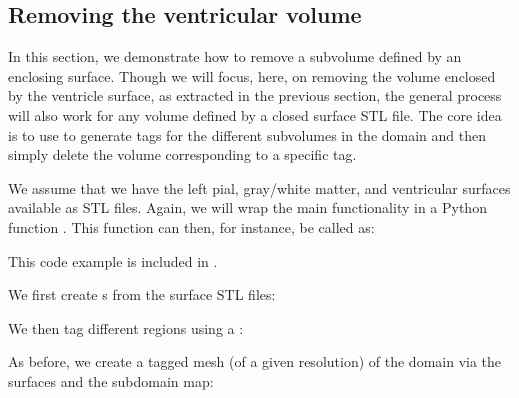 \subsection{Removing the ventricular volume}
\label{sec:chp4:tools:remove-vent:removal}  

In this section, we demonstrate how to remove a subvolume defined by
an enclosing surface. Though we will focus, here, on removing the
volume enclosed by the ventricle surface, as extracted in the previous
section, the general process will also work for any volume defined by
a closed surface STL file. The core idea is to use \svmtk{} to
generate tags for the different subvolumes in the domain and then
simply delete the volume corresponding to a specific tag.  

We assume that we have the left pial, gray/white matter, and ventricular
surfaces available as STL files. Again, we will wrap the main
functionality in a Python function
. This function can then, for
instance, be called as:

\noindent This code example is included in
.

We first create s from the surface STL files:

\noindent We then tag different regions using a : 

\noindent As before, we create a tagged mesh (of a given resolution)
of the domain via the surfaces and the subdomain map:

